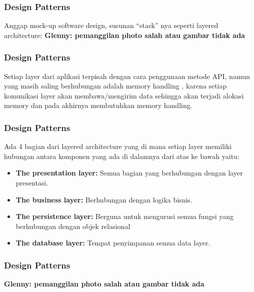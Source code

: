 \documentclass{beamer}
\begin{document}
\begin{frame}
\frametitle{Design Patterns}
Anggap mock-up software design, susunan “stack” nya seperti layered architecture:
\textbf{\color{blue} Glenny: pemanggilan photo salah atau gambar tidak ada}

\end{frame}

\begin{frame}
\frametitle{Design Patterns}
Setiap layer dari aplikasi terpisah dengan cara penggunaan metode API, namun yang masih saling berhubungan adalah memory handling , karena setiap komunikasi layer akan membawa/mengirim data sehingga akan terjadi alokasi memory dan pada akhirnya membutuhkan memory handling.
\end{frame}

\begin{frame}
\frametitle{Design Patterns}
Ada 4 bagian dari layered architecture yang di mana setiap layer memiliki hubungan antara komponen yang ada di dalamnya dari atas ke bawah yaitu:
\begin{itemize}
	\item \textbf{The presentation layer:} Semua bagian yang berhubungan dengan layer presentasi.
	\item \textbf{The business layer:} Berhubungan dengan logika bisnis.
	\item \textbf{The persistence layer:} Berguna untuk mengurusi semua fungsi yang berhubungan dengan objek relasional
	\item \textbf{The database layer:} Tempat penyimpanan semua data layer.
\end{itemize}
\end{frame}

\begin{frame}
\frametitle{Design Patterns}
\textbf{\color{blue} Glenny: pemanggilan photo salah atau gambar tidak ada}

\end{frame}
\end{document}
